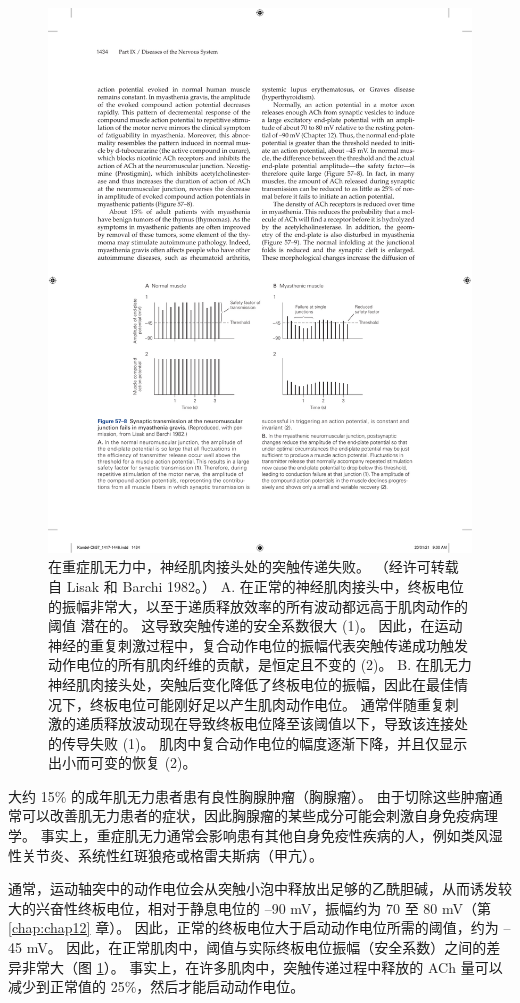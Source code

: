 \begin{figure}[htbp]
	\centering
	\includegraphics[width=0.7\linewidth]{chap57/fig_57_8}
	\caption{在重症肌无力中，神经肌肉接头处的突触传递失败。 （经许可转载自 Lisak 和 Barchi 1982。） A. 在正常的神经肌肉接头中，终板电位的振幅非常大，以至于递质释放效率的所有波动都远高于肌肉动作的阈值 潜在的。 这导致突触传递的安全系数很大 (1)。 因此，在运动神经的重复刺激过程中，复合动作电位的振幅代表突触传递成功触发动作电位的所有肌肉纤维的贡献，是恒定且不变的 (2)。 B. 在肌无力神经肌肉接头处，突触后变化降低了终板电位的振幅，因此在最佳情况下，终板电位可能刚好足以产生肌肉动作电位。 通常伴随重复刺激的递质释放波动现在导致终板电位降至该阈值以下，导致该连接处的传导失败 (1)。 肌肉中复合动作电位的幅度逐渐下降，并且仅显示出小而可变的恢复 (2)。}
	\label{fig:57_8}
\end{figure}


大约 15\% 的成年肌无力患者患有良性胸腺肿瘤（胸腺瘤）。
由于切除这些肿瘤通常可以改善肌无力患者的症状，因此胸腺瘤的某些成分可能会刺激自身免疫病理学。
事实上，重症肌无力通常会影响患有其他自身免疫性疾病的人，例如类风湿性关节炎、系统性红斑狼疮或格雷夫斯病（甲亢）。


通常，运动轴突中的动作电位会从突触小泡中释放出足够的乙酰胆碱，从而诱发较大的兴奋性终板电位，相对于静息电位的 –90 mV，振幅约为 70 至 80 mV（第 \ref{chap:chap12} 章）。
因此，正常的终板电位大于启动动作电位所需的阈值，约为 –45 mV。
因此，在正常肌肉中，阈值与实际终板电位振幅（安全系数）之间的差异非常大（图 \ref{fig:57_8}）。
事实上，在许多肌肉中，突触传递过程中释放的 ACh 量可以减少到正常值的 25\%，然后才能启动动作电位。


